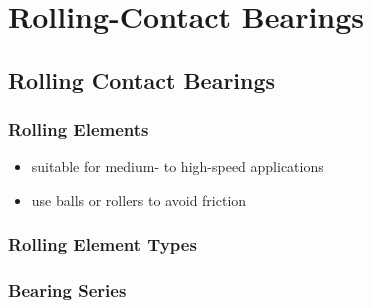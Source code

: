 \documentclass[
10pt,
a4paper,
openany,
svgnames,
]{book}
\begin{document}

\chapter{Rolling-Contact Bearings}

\section*{Rolling Contact Bearings}
\label{sec:org223e543}

\subsection*{Rolling Elements}
\label{sec:orgda844f8}
\begin{itemize}
\item suitable for medium- to high-speed applications
\item use balls or rollers to avoid friction
\end{itemize}

\subsection*{Rolling Element Types}
\label{sec:orgf0733bc}

\begin{center}
\end{center}
\begin{center}
\end{center}
\begin{center}
\end{center}

\subsection*{Bearing Series}
\label{sec:orgc9e647d}

\begin{center}
\end{center}
\end{document}
